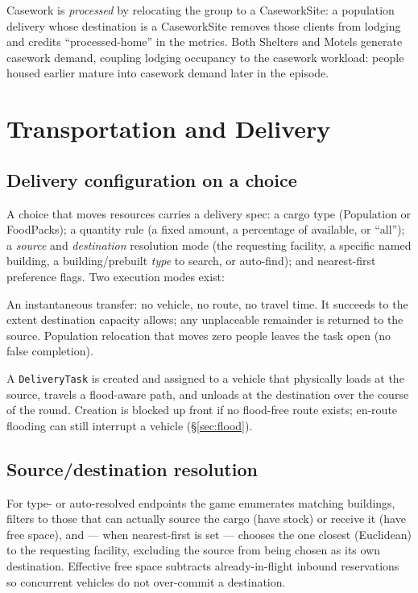 \documentclass[11pt]{article}
\newcommand{\code}[1]{\texttt{\small #1}}
\begin{document}
Casework is \emph{processed} by relocating the group to a CaseworkSite: a
population delivery whose destination is a CaseworkSite removes those clients
from lodging and credits ``processed-home'' in the metrics. Both Shelters and
Motels generate casework demand, coupling lodging occupancy to the casework
workload: people housed earlier mature into casework demand later in the episode.

\section{Transportation and Delivery}
\label{sec:transport}

\subsection{Delivery configuration on a choice}
A choice that moves resources carries a delivery spec: a cargo type
(Population or FoodPacks); a quantity rule (a fixed amount, a percentage of
available, or ``all''); a \emph{source} and \emph{destination} resolution mode
(the requesting facility, a specific named building, a building/prebuilt
\emph{type} to search, or auto-find); and nearest-first preference flags. Two
execution modes exist:

\begin{description}[nosep,leftmargin=1.4em]
\item[Immediate] An instantaneous transfer: no vehicle, no route, no travel
  time. It succeeds to the extent destination capacity allows; any unplaceable
  remainder is returned to the source. Population relocation that moves zero
  people leaves the task open (no false completion).
\item[Vehicle-queued] A \code{DeliveryTask} is created and assigned to a vehicle
  that physically loads at the source, travels a flood-aware path, and unloads at
  the destination over the course of the round. Creation is blocked up front if
  no flood-free route exists; en-route flooding can still interrupt a vehicle
  (\S\ref{sec:flood}).
\end{description}

\subsection{Source/destination resolution}
For type- or auto-resolved endpoints the game enumerates matching buildings,
filters to those that can actually source the cargo (have stock) or receive it
(have free space), and --- when nearest-first is set --- chooses the one closest
(Euclidean) to the requesting facility, excluding the source from being chosen as
its own destination. Effective free space subtracts already-in-flight inbound
reservations so concurrent vehicles do not over-commit a destination.
\end{document}
